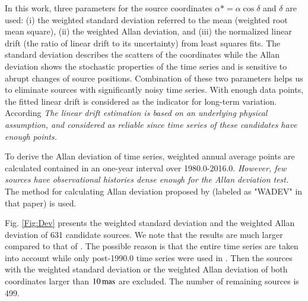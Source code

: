 \documentclass{aa}
\begin{document}
In this work, three parameters for the source coordinates $\alpha* = \alpha\cos\delta$ and $\delta$ are used: (i) the weighted standard deviation referred to the mean (weighted root mean square), (ii) the weighted Allan deviation, and (iii) the normalized linear drift (the ratio of linear drift to its uncertainty) from least squares fits. The standard deviation describes the scatters of the coordinates while the Allan deviation shows the stochastic properties of the time series and is sensitive to abrupt changes of source positions. Combination of these two parameters helps us to eliminate sources with significantly noisy time series. With enough data points, the fitted linear drift is considered as the indicator for long-term variation. According \emph{The linear drift estimation is based on an underlying physical assumption, and considered as reliable since time series of these candidates have enough points.}


To derive the Allan deviation of time series, weighted annual average points are calculated contained in an one-year interval over 1980.0-2016.0. \emph{However, few sources have observational histories dense enough for the Allan deviation test.} The method for calculating Allan deviation proposed by \cite{Malkin2008} (labeled as "WADEV" in that paper) is used.

Fig. \ref{Fig:Dev} presents the weighted standard deviation and the weighted Allan deviation of 631 candidate sources. We note that the results are much larger compared to that of \cite{FV2003}. The possible reason is that the entire time series are taken into account while only post-1990.0 time series were used in \citep{FV2003}. Then the sources with the weighted standard deviation or the weighted Allan deviation of both coordinates larger than $10\,\rm{mas}$ are excluded. The number of remaining sources is 499.
\end{document}
